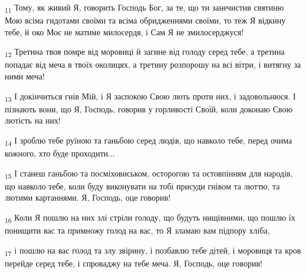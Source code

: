 \begin{tcolorbox}
\textsubscript{11} Тому, як живий Я, говорить Господь Бог, за те, що ти занечистив святиню Мою всіма гидотами своїми та всіма обридженнями своїми, то теж Я відкину тебе, й око Моє не матиме милосердя, і Сам Я не змилосерджуся!
\end{tcolorbox}
\begin{tcolorbox}
\textsubscript{12} Третина твоя помре від моровиці й загине від голоду серед тебе, а третина попадає від меча в твоїх околицях, а третину розпорошу на всі вітри, і витягну за ними меча!
\end{tcolorbox}
\begin{tcolorbox}
\textsubscript{13} І докінчиться гнів Мій, і Я заспокою Свою лють проти них, і задовольнюся. І пізнають вони, що Я, Господь, говорив у горливості Своїй, коли доконаю Свою лютість на них!
\end{tcolorbox}
\begin{tcolorbox}
\textsubscript{14} І зроблю тебе руїною та ганьбою серед людів, що навколо тебе, перед очима кожного, хто буде проходити...
\end{tcolorbox}
\begin{tcolorbox}
\textsubscript{15} І станеш ганьбою та посміховиськом, осторогою та остовпінням для народів, що навколо тебе, коли буду виконувати на тобі присуди гнівом та люттю, та лютими картаннями. Я, Господь, оце говорив!
\end{tcolorbox}
\begin{tcolorbox}
\textsubscript{16} Коли Я пошлю на них злі стріли голоду, що будуть нищівними, що пошлю їх понищити вас та примножу голод на вас, то Я зламаю вам підпору хліба,
\end{tcolorbox}
\begin{tcolorbox}
\textsubscript{17} і пошлю на вас голод та злу звірину, і позбавлю тебе дітей, і моровиця та кров перейде серед тебе, і спроваджу на тебе меча. Я, Господь, оце говорив!
\end{tcolorbox}
